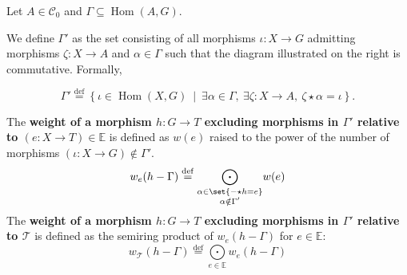 \begin{definition}
    \label{def:weight_excluding}
    Let \( A \in \mathcal{C}_0 \) and $\Gamma \subseteq \operatorname{Hom}(A,G)$.
    \newline
    \noindent
    \begin{minipage}{0.6\textwidth}
        We define $\Gamma'$ as the set consisting of all morphisms \( \iota : X \to G \) admitting morphisms \( \zeta \colon X \to A \) and \( \alpha \in \Gamma \) such that the diagram illustrated on the right is commutative. Formally, 
    \end{minipage}
    \begin{minipage}{0.4\textwidth}
        \hfill 
    \end{minipage}

    \[
    \Gamma' \overset{\operatorname{def}}{=} \left\{ \iota \in \operatorname{Hom}(X, G)~\middle|~\exists \alpha \in \Gamma,~\exists \zeta:X \to A,~\zeta \star \alpha = \iota \right\}.
    \]

    \noindent
    The \textbf{weight of a morphism \(h : G \to T\) excluding morphisms in \( \Gamma' \) relative to $(e:X \to T) \in \mathbb{E}$} is defined as $w(e)$ raised to the power of the number of morphisms \( (\iota : X \to G) \notin \Gamma' \).
        \[
        w_e(h - \Gamma) \overset{\operatorname{def}}{=} \underset{
            \substack{\alpha \in \set{- \star h = e} \\
                        \alpha \notin \Gamma'}}{\bigodot} w(e)\] 
        The \textbf{weight of a morphism $h: G \to T$ excluding morphisms in \( \Gamma' \) relative to \(\mathcal{T}\)} is defined as the semiring product of $w_e(h-\Gamma)$ for $e \in \mathbb{E}$:
        \[ 
            w_\mathcal{T}(h-\Gamma) \overset{\operatorname{def}}{=} \underset{e \in \mathbb{E}}{\bigodot} 
        w_e(h-\Gamma)
                \]
\end{definition} 
